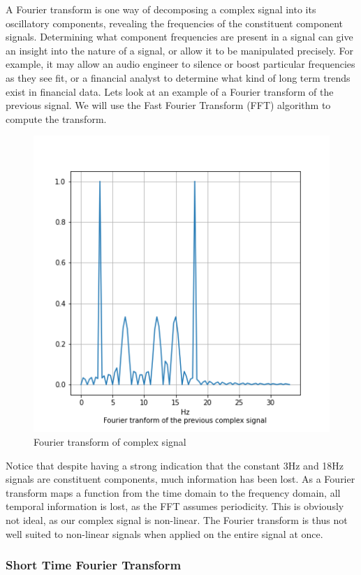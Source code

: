\documentclass[
  paper=a4,
  ,captions=tableheading
]{scrartcl}
\begin{document}
A Fourier transform is one way of decomposing a complex signal into its
oscillatory components, revealing the frequencies of the constituent
component signals. Determining what component frequencies are present in
a signal can give an insight into the nature of a signal, or allow it to
be manipulated precisely. For example, it may allow an audio engineer to
silence or boost particular frequencies as they see fit, or a financial
analyst to determine what kind of long term trends exist in financial
data. Lets look at an example of a Fourier transform of the previous
signal. We will use the Fast Fourier Transform (FFT) algorithm to
compute the transform.

\begin{figure}
\centering
\includegraphics{img/fft.png}
\caption{Fourier transform of complex signal}
\end{figure}

Notice that despite having a strong indication that the constant 3Hz and
18Hz signals are constituent components, much information has been lost.
As a Fourier transform maps a function from the time domain to the
frequency domain, all temporal information is lost, as the FFT assumes
periodicity. This is obviously not ideal, as our complex signal is
non-linear. The Fourier transform is thus not well suited to non-linear
signals when applied on the entire signal at once.

\hypertarget{short-time-fourier-transform}{%
\subsubsection{Short Time Fourier
Transform}\label{short-time-fourier-transform}}
\end{document}
